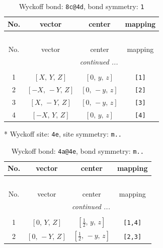 \documentclass[fleqn,8pt]{jsarticle}
\begin{document}
\begin{longtable}{cccc}
\caption{Wyckoff bond: {\tt 8c@4d}, bond symmetry: {\tt 1}}
 \\
 \hline \hline
No. & vector & center & mapping \\ \hline \endfirsthead

\multicolumn{3}{l}{\tablename\ \thetable{}} \\
 \hline \hline
No. & vector & center & mapping \\ \hline \endhead

 \hline \hline
\multicolumn{3}{r}{\footnotesize\it continued ...} \\ \endfoot

 \hline \hline
\multicolumn{3}{r}{} \\ \endlastfoot

1 & $\left[ X,\, Y,\, Z \right]$ & $\left[ 0,\, y,\, z \right]$ & {\tt [1]} \\ \hline
2 & $\left[ - X,\, - Y,\, Z \right]$ & $\left[ 0,\, - y,\, z \right]$ & {\tt [2]} \\ \hline
3 & $\left[ X,\, - Y,\, Z \right]$ & $\left[ 0,\, - y,\, z \right]$ & {\tt [3]} \\ \hline
4 & $\left[ - X,\, Y,\, Z \right]$ & $\left[ 0,\, y,\, z \right]$ & {\tt [4]} \\
\end{longtable}
* Wyckoff site: {\tt 4e}, site symmetry: {\tt m..}
\renewcommand{\arraystretch}{1.2}
\begin{longtable}{cccc}
\caption{Wyckoff bond: {\tt 4a@4e}, bond symmetry: {\tt m..}}
 \\
 \hline \hline
No. & vector & center & mapping \\ \hline \endfirsthead

\multicolumn{3}{l}{\tablename\ \thetable{}} \\
 \hline \hline
No. & vector & center & mapping \\ \hline \endhead

 \hline \hline
\multicolumn{3}{r}{\footnotesize\it continued ...} \\ \endfoot

 \hline \hline
\multicolumn{3}{r}{} \\ \endlastfoot

1 & $\left[ 0,\, Y,\, Z \right]$ & $\left[ \frac{1}{2},\, y,\, z \right]$ & {\tt [1,4]} \\ \hline
2 & $\left[ 0,\, - Y,\, Z \right]$ & $\left[ \frac{1}{2},\, - y,\, z \right]$ & {\tt [2,3]} \\
\end{longtable}
\end{document}
